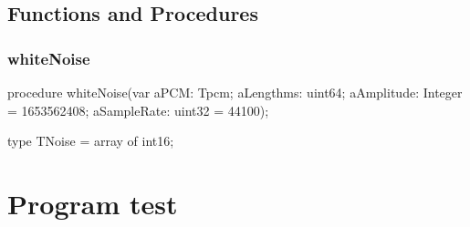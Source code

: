 \documentclass{report}
\newif\ifpdf
\begin{document}
\section{Functions and Procedures}
\ifpdf
\subsection*{\large{\textbf{whiteNoise}}\normalsize\hspace{1ex}\hrulefill}
\else
\subsection*{whiteNoise}
\fi
\label{morse.pcm.whitenoise-whiteNoise}
\begin{list}{}{
\setlength{\itemindent}{0cm}
\setlength{\listparindent}{0cm}
\setlength{\leftmargin}{\evensidemargin}
\addtolength{\leftmargin}{\tmplength}
\settowidth{\labelsep}{X}
\addtolength{\leftmargin}{\labelsep}
\setlength{\labelwidth}{\tmplength}
}
\item[\textbf{Declaration}\hfill]
\ifpdf
\begin{flushleft}
\fi
\begin{ttfamily}
procedure whiteNoise(var aPCM: Tpcm; aLengthms: uint64; aAmplitude: Integer = 1653562408; aSampleRate: uint32 = 44100);\end{ttfamily}

\ifpdf
\end{flushleft}
\fi

\par
\item[\textbf{Description}]
type TNoise = array of int16;

\end{list}
\chapter{Program test}
\label{test}
\end{document}
